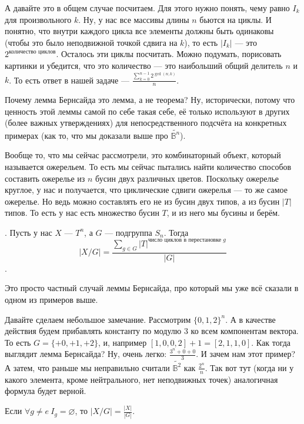 \documentclass{article}
\begin{document}
\begin{itemize}
\begin{Example}
        \end{Example}
        \begin{Example}
            А давайте это в общем случае посчитаем. Для этого нужно понять, чему равно $I_k$ для произвольного $k$. Ну, у нас все массивы длины $n$ бьются на циклы. И понятно, что внутри каждого цикла все элементы должны быть одинаковы (чтобы это было неподвижной точкой сдвига на $k$), то есть $|I_k|$ --- это $2^{\text{количество циклов}}$. Осталось эти циклы посчитать. Можно подумать, порисовать картинки и убедится, что это количество --- это наибольший общий делитель $n$ и $k$. То есть ответ в нашей задаче --- $\frac{\sum\limits_{k=0}^{n-1}2^{\gcd(n;k)}}n$.
        \end{Example}
        \begin{Comment}
            Почему лемма Бернсайда это лемма, а не теорема? Ну, исторически, потому что ценность этой леммы самой по себе такая себе, её только используют в других (более важных утверждениях) для непосредственного подсчёта на конкретных примерах (как то, что мы доказали выше про $\widetilde{\mathbb B^n}$).
        \end{Comment}
        \begin{Comment}
            Вообще то, что мы сейчас рассмотрели, это комбинаторный объект, который называется ожерельем. То есть мы сейчас пытались найти количество способов составить ожерелье из $n$ бусин двух различных цветов. Поскольку ожерелье круглое, у нас и получается, что циклические сдвиги ожерелья --- то же самое ожерелье. Но ведь можно составлять его не из бусин двух типов, а из бусин $|T|$ типов. То есть у нас есть множество бусин $T$, и из него мы бусины и берём.
        \end{Comment}
        \thm {}. Пусть у нас $X$ --- $T^n$, а $G$ --- подгруппа $S_n$. Тогда $$|X/G|=\frac{\sum\limits_{g\in G}{|T|}^{\text{число циклов в перестановке }g}}{|G|}$$.
        \begin{Proof}
            Это просто частный случай леммы Бернсайда, про который мы уже всё сказали в одном из примеров выше.
        \end{Proof}
        \begin{Example}
            Давайте сделаем небольшое замечание. Рассмотрим $\{0,1,2\}^n$. А в качестве действия будем прибавлять константу по модулю 3 ко всем компонентам вектора. То есть $G=\{+0,+1,+2\}$, и, например $[1,0,0,2]+1=[2,1,1,0]$. Как тогда выглядит лемма Бернсайда? Ну, очень легко: $\frac{3^n+0+0}3$. И зачем нам этот пример? А затем, что раньше мы неправильно считали $\widetilde{\mathbb B^2}$ как $\frac{2^n}n$. Так вот тут (когда ни у какого элемента, кроме нейтрального, нет неподвижных точек) аналогичная формула будет верной. 
        \end{Example}
        \thm Если $\forall g\neq e~I_g=\varnothing$, то $|X/G|=\frac{|X|}{|G|}$.
    \end{itemize}
\end{document}
